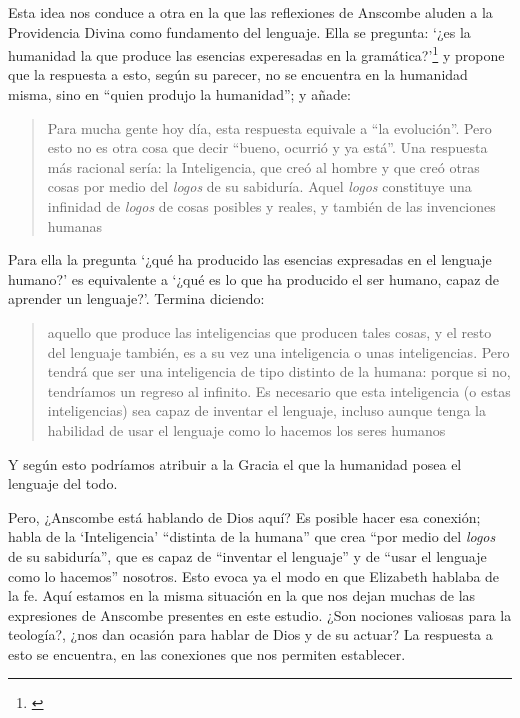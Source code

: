 Esta idea nos conduce a otra en la que las reflexiones de Anscombe aluden a la Providencia Divina como fundamento del lenguaje. Ella se pregunta: \enquote*{¿es la humanidad la que produce las esencias experesadas en la gramática?}\footnote{\Cite[Cf.][72]{torralbaynubiola2005fayeh:esencia}} y propone que la respuesta a esto, según su parecer, no se encuentra en la humanidad misma, sino en \enquote{quien produjo la humanidad}; y añade: \blockquote[{\Cite[73]{torralbaynubiola2005fayeh:esencia}}]{Para mucha gente hoy día, esta respuesta equivale a ``la evolución''. Pero esto no es otra cosa que decir ``bueno, ocurrió y ya está''. Una respuesta más racional sería: la Inteligencia, que creó al hombre y que creó otras cosas por medio del \emph{logos} de su sabiduría. Aquel \emph{logos} constituye una infinidad de \emph{logos} de cosas posibles y reales, y también de las invenciones humanas}. Para ella la pregunta \enquote*{¿qué ha producido las esencias expresadas en el lenguaje humano?} es equivalente a \enquote*{¿qué es lo que ha producido el ser humano, capaz de aprender un lenguaje?}. Termina diciendo: \blockquote[{\Cite[74]{torralbaynubiola2005fayeh:esencia}}]{aquello que produce las inteligencias que producen tales cosas, y el resto del lenguaje también, es a su vez una inteligencia o unas inteligencias. Pero tendrá que ser una inteligencia de tipo distinto de la humana: porque si no, tendríamos un regreso al infinito. Es necesario que esta inteligencia (o estas inteligencias) sea capaz de inventar el lenguaje, incluso aunque tenga la habilidad de usar el lenguaje como lo hacemos los seres humanos}. Y según esto podríamos atribuir a la Gracia el que la humanidad posea el lenguaje del todo.

Pero, ¿Anscombe está hablando de Dios aquí? Es posible hacer esa conexión; habla de la `Inteligencia' ``distinta de la humana'' que crea ``por medio del \emph{logos} de su sabiduría'', que es capaz de ``inventar el lenguaje'' y de ``usar el lenguaje como lo hacemos'' nosotros. Esto evoca ya el modo en que Elizabeth hablaba de la fe. Aquí estamos en la misma situación en la que nos dejan muchas de las expresiones de Anscombe presentes en este estudio. ¿Son nociones valiosas para la teología?, ¿nos dan ocasión para hablar de Dios y de su actuar? La respuesta a esto se encuentra, en las conexiones que nos permiten establecer.

